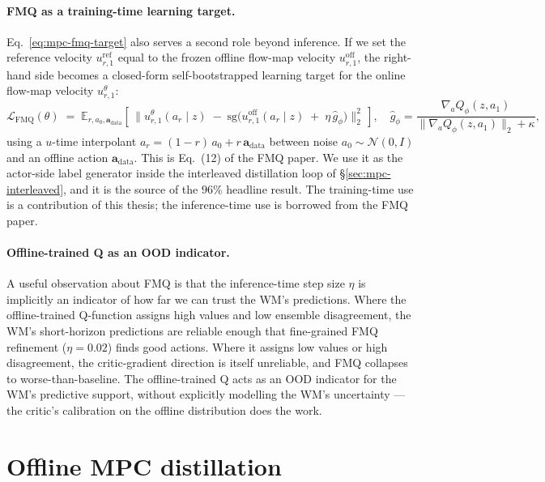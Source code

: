\paragraph{FMQ as a training-time learning target.}
Eq.~\eqref{eq:mpc-fmq-target} also serves a second role beyond
inference. If we set the reference velocity $u^{\mathrm{ref}}_{r,1}$
equal to the frozen offline flow-map velocity $u^{\text{off}}_{r,1}$,
the right-hand side becomes a closed-form self-bootstrapped learning
target for the online flow-map velocity $u^\theta_{r,1}$:
\begin{equation}
    \mathcal{L}_{\text{FMQ}}(\theta) \;=\; \mathbb{E}_{r, a_0, \mathbf{a}_{\text{data}}}\!\left[\,
        \Big\| u^\theta_{r,1}(a_r \mid z) \;-\; \mathrm{sg}\!\Big(u^{\text{off}}_{r,1}(a_r \mid z) \;+\; \eta\,\hat g_\phi\Big) \Big\|_2^2\,\right],
    \quad \hat g_\phi = \frac{\nabla_a Q_\phi(z, a_1)}{\|\nabla_a Q_\phi(z, a_1)\|_2 + \kappa},
    \label{eq:mpc-fmq-loss}
\end{equation}
using a $u$-time interpolant $a_r = (1 - r)\,a_0 + r\,\mathbf{a}_{\text{data}}$
between noise $a_0 \sim \mathcal{N}(0, I)$ and an offline action
$\mathbf{a}_{\text{data}}$. This is Eq.~(12) of the FMQ paper. We use
it as the actor-side label generator inside the interleaved
distillation loop of §\ref{sec:mpc-interleaved}, and it is the source
of the $96\%$ headline result. The training-time use is a contribution
of this thesis; the inference-time use is borrowed from the FMQ paper.

\paragraph{Offline-trained Q as an OOD indicator.}
A useful observation about FMQ is that the inference-time step size
$\eta$ is implicitly an indicator of how far we can trust the WM's
predictions. Where the offline-trained Q-function assigns high values
and low ensemble disagreement, the WM's short-horizon predictions are
reliable enough that fine-grained FMQ refinement ($\eta=0.02$) finds
good actions. Where it assigns low values or high disagreement, the
critic-gradient direction is itself unreliable, and FMQ collapses to
worse-than-baseline. The offline-trained Q acts as an OOD indicator
for the WM's predictive support, without explicitly modelling the
WM's uncertainty --- the critic's calibration on the offline
distribution does the work.

\section{Offline MPC distillation}
\label{sec:mpc-offline-distill}

